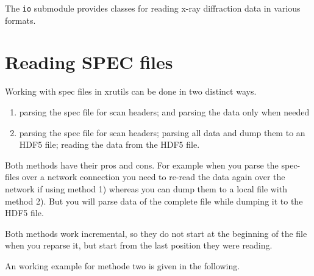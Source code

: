 %
%
%
%


The {\tt io} submodule provides classes for reading x-ray diffraction data in
various formats. 

\section{Reading SPEC files}

Working with spec files in xrutils can be done in two distinct ways. 
\begin{enumerate}
 \item parsing the spec file for scan headers; and parsing the data only when needed
 \item parsing the spec file for scan headers; parsing all data and dump them to an HDF5 file; reading the data from the HDF5 file. 
\end{enumerate}
Both methods have their pros and cons. For example when you parse the spec-files over a network connection you need to re-read the data again over the network if using method 1) whereas you can dump them to a local file with method 2). But you will parse data of the complete file while dumping it to the HDF5 file. 

Both methods work incremental, so they do not start at the beginning of the file when you reparse it, but start from the last position they were reading.

An working example for methode two is given in the following.

